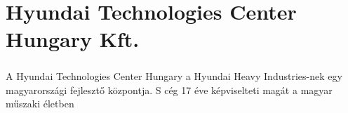 \chapter*{Hyundai Technologies Center Hungary Kft.}

\paragraph{}
A Hyundai Technologies Center Hungary a Hyundai Heavy Industries-nek egy magyarországi fejlesztő központja. S cég 17 éve képviselteti magát a magyar műszaki életben

